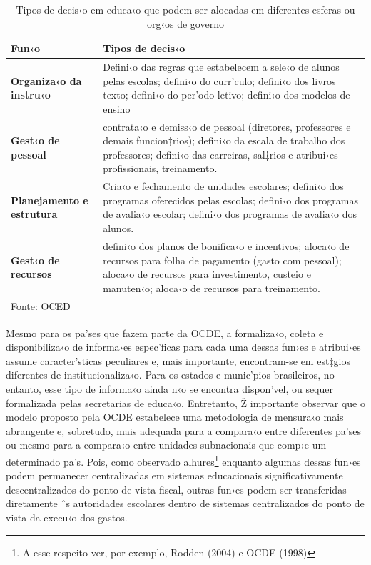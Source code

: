 \documentclass[a4paper, 12pt]{article}
\begin{document}
\begin{table}[htb]\centering
\begin{footnotesize}
\def\sym#1{\ifmmode^{#1}\else\(^{#1}\)\fi}
\caption{Tipos de decis‹o em educa‹o que podem ser alocadas 
\newline em diferentes esferas ou org‹os de governo} 
\label{tab: taboecd}
\begin{tabular}{ p{2.2cm} | p{9cm}}  
\toprule
\bf{Fun‹o} & \bf{Tipos de decis‹o}  \\
\midrule
\hline
\bf{Organiza‹o da instru‹o} & Defini‹o das regras que estabelecem a sele‹o de alunos pelas escolas; defini‹o do curr’culo; defini‹o dos livros texto; defini‹o do per’odo letivo; defini‹o dos modelos de ensino \\
\hline
\bf{Gest‹o de pessoal} & contrata‹o e demiss‹o de pessoal (diretores, professores e demais funcion‡rios); defini‹o da escala de trabalho dos professores; defini‹o das carreiras, sal‡rios e atribui›es profissionais, treinamento. \\
\hline
\bf{Planejamento e estrutura} & Cria‹o e fechamento de unidades escolares; defini‹o dos programas oferecidos pelas escolas; defini‹o dos programas de avalia‹o escolar; defini‹o dos programas de avalia‹o dos alunos.   \\
\hline
\bf{Gest‹o de recursos} & defini‹o dos planos de bonifica‹o e incentivos; aloca‹o de recursos para folha de pagamento (gasto com pessoal); aloca‹o de recursos para investimento, custeio e manuten‹o; aloca‹o de recursos para treinamento.   \\
\hline
\bottomrule
\multicolumn{2}{l}{\footnotesize Fonte: OCED}\\
\end{tabular}
\end{footnotesize}
\end{table}




Mesmo para os pa’ses que fazem parte da OCDE, a formaliza‹o, coleta e disponibiliza‹o de informa›es espec’ficas para cada uma dessas fun›es e atribui›es assume caracter’sticas peculiares e, mais importante, encontram-se em est‡gios diferentes de institucionaliza‹o. Para os estados e munic’pios brasileiros, no entanto, esse tipo de informa‹o ainda n‹o se encontra dispon’vel, ou sequer formalizada pelas secretarias de educa‹o. Entretanto, Ž importante observar que o modelo proposto pela OCDE estabelece uma metodologia de mensura‹o mais abrangente e, sobretudo, mais adequada para a compara‹o entre diferentes pa’ses ou mesmo para a compara‹o entre unidades subnacionais que comp›e um determinado pa’s. Pois, como observado alhures\footnote{A esse respeito ver, por exemplo, Rodden (2004) e OCDE (1998)} enquanto algumas dessas fun›es podem permanecer centralizadas em sistemas educacionais significativamente descentralizados do ponto de vista fiscal, outras fun›es podem ser transferidas diretamente ˆs autoridades escolares dentro de sistemas centralizados do ponto de vista da execu‹o dos gastos. 
\end{document}
